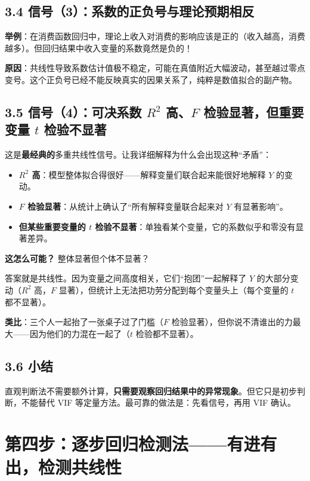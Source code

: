 \documentclass[12pt,a4paper]{ctexart}
\begin{document}
\subsection*{3.4 信号（3）：系数的正负号与理论预期相反}

\textbf{举例}：在消费函数回归中，理论上收入对消费的影响应该是正的（收入越高，消费越多）。但回归结果中收入变量的系数竟然是负的！

\textbf{原因}：共线性导致系数估计值极不稳定，可能在真值附近大幅波动，甚至越过零点变号。这个正负号已经不能反映真实的因果关系了，纯粹是数值拟合的副产物。

\subsection*{3.5 信号（4）：可决系数 $R^2$ 高、$F$ 检验显著，但重要变量 $t$ 检验不显著}

这是\textbf{最经典的}多重共线性信号。让我详细解释为什么会出现这种“矛盾”：

\begin{itemize}
  \item \textbf{$R^2$ 高}：模型整体拟合得很好——解释变量们联合起来能很好地解释 $Y$ 的变动。
  \item \textbf{$F$ 检验显著}：从统计上确认了“所有解释变量联合起来对 $Y$ 有显著影响”。
  \item \textbf{但某些重要变量的 $t$ 检验不显著}：单独看某个变量，它的系数似乎和零没有显著差异。
\end{itemize}

\textbf{这怎么可能？} 整体显著但个体不显著？

答案就是共线性。因为变量之间高度相关，它们“抱团”一起解释了 $Y$ 的大部分变动（$R^2$ 高，$F$ 显著），但统计上无法把功劳分配到每个变量头上（每个变量的 $t$ 都不显著）。

\textbf{类比}：三个人一起抬了一张桌子过了门槛（$F$ 检验显著），但你说不清谁出的力最大——因为他们的力混在一起了（$t$ 检验都不显著）。

\subsection*{3.6 小结}

直观判断法不需要额外计算，\textbf{只需要观察回归结果中的异常现象}。但它只是初步判断，不能替代 VIF 等定量方法。最可靠的做法是：先看信号，再用 VIF 确认。

\section*{第四步：逐步回归检测法——有进有出，检测共线性}
\end{document}

